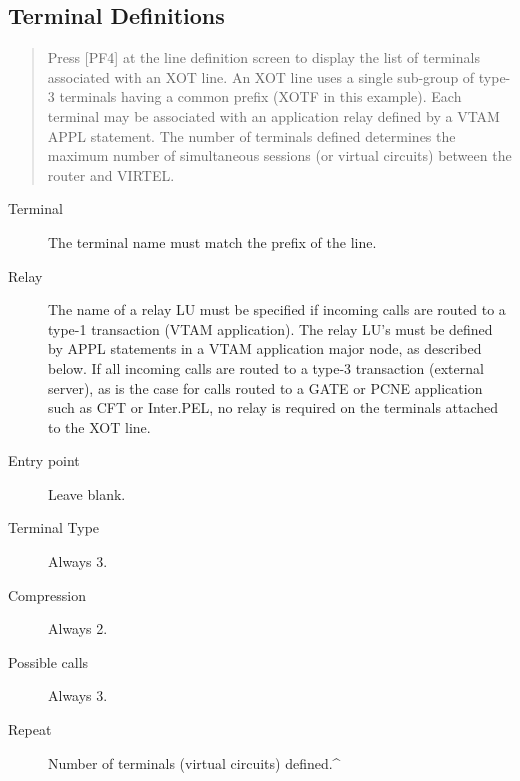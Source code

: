 \documentclass[letterpaper,10pt,english]{sphinxmanual}
\begin{document}
\subsection{Terminal Definitions}
\label{\detokenize{connectivity_guide:index-53}}\label{\detokenize{connectivity_guide:id23}}\begin{quote}

Press {[}PF4{]} at the line definition screen to display the list of terminals associated with an XOT line. An XOT line uses a single sub-group of type-3 terminals having a common prefix (XOTF in this example). Each terminal may be associated with an application relay defined by a VTAM APPL statement. The number of terminals defined determines the maximum number of simultaneous sessions (or virtual circuits) between the router and VIRTEL.
\end{quote}


\begin{description}
\item[{Terminal}] \leavevmode
The terminal name must match the prefix of the line.

\item[{Relay}] \leavevmode
The name of a relay LU must be specified if incoming calls are
routed to a type-1 transaction (VTAM application). The relay LU’s
must be defined by APPL statements in a VTAM application major node,
as described below. If all incoming calls are routed to a type-3
transaction (external server), as is the case for calls routed to a
GATE or PCNE application such as CFT or Inter.PEL, no relay is
required on the terminals attached to the XOT line.

\item[{Entry point}] \leavevmode
Leave blank.

\item[{Terminal Type}] \leavevmode
Always 3.

\item[{Compression}] \leavevmode
Always 2.

\item[{Possible calls}] \leavevmode
Always 3.

\item[{Repeat}] \leavevmode
Number of terminals (virtual circuits) defined.\textasciicircum{}

\end{description}
\end{document}
